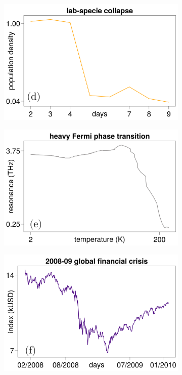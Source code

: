 \documentclass[../main.tex]{subfiles}
\begin{document}
\begin{figure}[H]
    \begin{subfigure}[b]{0.325\textwidth}
        \centering 
        \includegraphics[keepaspectratio, width = \linewidth]{../figures/fig1.1.4.png}
        \label{fig1.1.4}
    \end{subfigure}
    \hfill
    \begin{subfigure}[b]{0.325\textwidth}
        \centering 
        \includegraphics[keepaspectratio, width = \linewidth]{../figures/fig1.1.5.png}
        \label{fig1.1.5}
    \end{subfigure}
    \hfill
    \begin{subfigure}[b]{0.325\textwidth}
        \centering 
        \includegraphics[keepaspectratio, width = \linewidth]{../figures/fig1.1.6.png}

\end{subfigure}
\end{figure}
\end{document}
